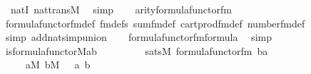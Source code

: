 \begin{isabellebody}
\ \ nat{\isacharunderscore}{\kern0pt}{}I\ nat{\isacharunderscore}{\kern0pt}trans{\isacharunderscore}{\kern0pt}M\ \isamarkupfalse%
\ simp\isanewline
\ \ \isamarkupfalse%
\ {}{\isacharcolon}{\kern0pt}{\isachardoublequoteopen}arity{\isacharparenleft}{\kern0pt}formula{\isacharunderscore}{\kern0pt}functor{\isacharunderscore}{\kern0pt}fm{\isacharparenleft}{\kern0pt}{}{\isacharcomma}{\kern0pt}{}{\isacharparenright}{\kern0pt}{\isacharparenright}{\kern0pt}\ {\isacharequal}{\kern0pt}\ {}{\isachardoublequoteclose}\isanewline
\ \ \ \ \isamarkupfalse%
\ formula{\isacharunderscore}{\kern0pt}functor{\isacharunderscore}{\kern0pt}fm{\isacharunderscore}{\kern0pt}def\ fm{\isacharunderscore}{\kern0pt}defs\ sum{\isacharunderscore}{\kern0pt}fm{\isacharunderscore}{\kern0pt}def\ cartprod{\isacharunderscore}{\kern0pt}fm{\isacharunderscore}{\kern0pt}def\ number{}{\isacharunderscore}{\kern0pt}fm{\isacharunderscore}{\kern0pt}def\isanewline
\ \ \ \ \isamarkupfalse%
\ {\isacharparenleft}{\kern0pt}simp\ add{\isacharcolon}{\kern0pt}nat{\isacharunderscore}{\kern0pt}simp{\isacharunderscore}{\kern0pt}union{\isacharparenright}{\kern0pt}\isanewline
\ \ \isamarkupfalse%
\ {}{\isacharcolon}{\kern0pt}{\isachardoublequoteopen}formula{\isacharunderscore}{\kern0pt}functor{\isacharunderscore}{\kern0pt}fm{\isacharparenleft}{\kern0pt}{}{\isacharcomma}{\kern0pt}{}{\isacharparenright}{\kern0pt}{\isasymin}formula{\isachardoublequoteclose}\ \isamarkupfalse%
\ simp\isanewline
\ \ \isamarkupfalse%
\ {\isachardoublequoteopen}is{\isacharunderscore}{\kern0pt}formula{\isacharunderscore}{\kern0pt}functor{\isacharparenleft}{\kern0pt}{\isacharhash}{\kern0pt}{\isacharhash}{\kern0pt}M{\isacharcomma}{\kern0pt}a{\isacharcomma}{\kern0pt}b{\isacharparenright}{\kern0pt}\ {\isasymlongleftrightarrow}\isanewline
\ \ \ \ \ \ \ \ sats{\isacharparenleft}{\kern0pt}M{\isacharcomma}{\kern0pt}\ formula{\isacharunderscore}{\kern0pt}functor{\isacharunderscore}{\kern0pt}fm{\isacharparenleft}{\kern0pt}{}{\isacharcomma}{\kern0pt}{}{\isacharparenright}{\kern0pt}{\isacharcomma}{\kern0pt}\ {\isacharbrackleft}{\kern0pt}b{\isacharcomma}{\kern0pt}a{\isacharbrackright}{\kern0pt}{\isacharparenright}{\kern0pt}{\isachardoublequoteclose}\isanewline
\ \ \ \ \ {\isachardoublequoteopen}a{\isasymin}M{\isachardoublequoteclose}\ {\isachardoublequoteopen}b{\isasymin}M{\isachardoublequoteclose}\ \ \ a\ b\isanewline

\end{isabellebody}
